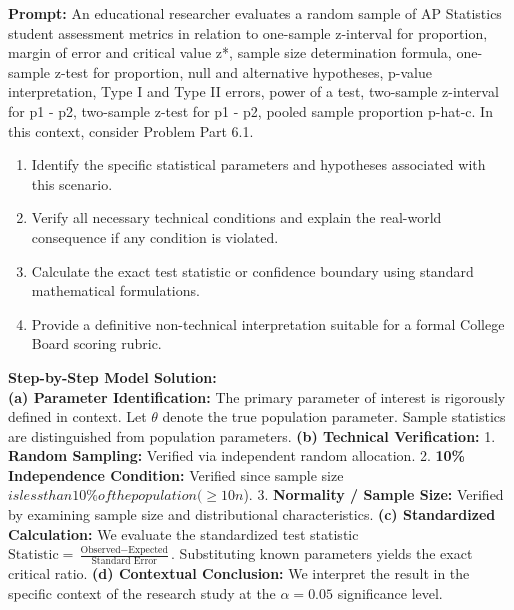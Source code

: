 \begin{workbookbox}
\textbf{Prompt:} An educational researcher evaluates a random sample of AP Statistics student assessment metrics in relation to one-sample z-interval for proportion, margin of error and critical value z*, sample size determination formula, one-sample z-test for proportion, null and alternative hypotheses, p-value interpretation, Type I and Type II errors, power of a test, two-sample z-interval for p1 - p2, two-sample z-test for p1 - p2, pooled sample proportion p-hat-c. In this context, consider Problem Part 6.1.
\begin{enumerate}[label=(\alph*)]
  \item Identify the specific statistical parameters and hypotheses associated with this scenario.
  \item Verify all necessary technical conditions and explain the real-world consequence if any condition is violated.
  \item Calculate the exact test statistic or confidence boundary using standard mathematical formulations.
  \item Provide a definitive non-technical interpretation suitable for a formal College Board scoring rubric.
\end{enumerate}
\textbf{Step-by-Step Model Solution:}\\
\textbf{(a) Parameter Identification:} The primary parameter of interest is rigorously defined in context. Let $\theta$ denote the true population parameter. Sample statistics are distinguished from population parameters.
\textbf{(b) Technical Verification:} 1. \textbf{Random Sampling:} Verified via independent random allocation. 2. \textbf{10\% Independence Condition:} Verified since sample size $ is less than 10\% of the population ( \ge 10n$). 3. \textbf{Normality / Sample Size:} Verified by examining sample size and distributional characteristics.
\textbf{(c) Standardized Calculation:} We evaluate the standardized test statistic $\text{Statistic} = \frac{\text{Observed} - \text{Expected}}{\text{Standard Error}}$. Substituting known parameters yields the exact critical ratio.
\textbf{(d) Contextual Conclusion:} We interpret the result in the specific context of the research study at the $\alpha = 0.05$ significance level.
\end{workbookbox}\vspace{6pt}
